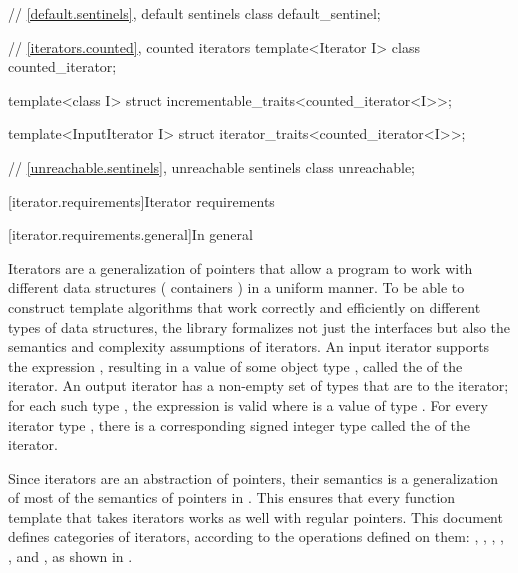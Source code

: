 \begin{addedblock}
\begin{codeblock}
  // \ref{default.sentinels}, default sentinels
  class default_sentinel;

  // \ref{iterators.counted}, counted iterators
  template<Iterator I> class counted_iterator;

  template<class I>
    struct incrementable_traits<counted_iterator<I>>;

  template<InputIterator I>
    struct iterator_traits<counted_iterator<I>>;

  // \ref{unreachable.sentinels}, unreachable sentinels
  class unreachable;
\end{codeblock}\end{addedblock}\begin{codeblock}

  // \ref{stream.iterators}, stream iterators
  [...]
}
\end{codeblock}

[iterator.requirements]{Iterator requirements}

[iterator.requirements.general]{In general}

\pnum
{}%
Iterators are a generalization of pointers that allow a \Cpp{} program
to work with different data structures
( containers ) in a uniform manner.
To be able to construct template algorithms that work correctly and efficiently
on different types of data structures, the library formalizes  not just
the interfaces but also the semantics and complexity assumptions of iterators.
An input iterator
supports the expression
,
resulting in a value of some object type
,
called the
of the iterator.
An output iterator  has a non-empty set of types that are
 to the iterator;
for each such type , the expression 
is valid where  is a value of type .
For every iterator type
, there is a corresponding signed integer type called the
of the iterator.

\pnum
Since iterators are an abstraction of pointers, their semantics is
a generalization of most of the semantics of pointers in \Cpp{}.
This ensures that every
function template
that takes iterators
works as well with regular pointers.
This document defines
 categories of iterators, according to the operations
defined on them:
,
,
,
,
,
and
,
as shown in .

